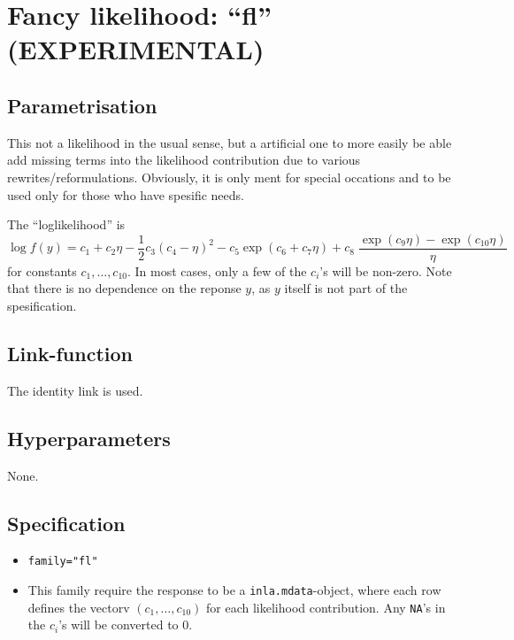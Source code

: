 \documentclass[a4paper,11pt]{article}
\begin{document}
\section*{Fancy likelihood: ``fl'' (EXPERIMENTAL)}

\subsection*{Parametrisation}

This not a likelihood in the usual sense, but a artificial one to more
easily be able add missing terms into the likelihood contribution due
to various rewrites/reformulations. Obviously, it is only ment for
special occations and to be used only for those who have spesific
needs.

The ``loglikelihood'' is
\begin{displaymath}
    \log f(y) = c_1 + c_2 \eta -\frac{1}{2} c_3 (c_4 - \eta)^{2} -
    c_5 \exp(c_6 + c_7 \eta) + c_8\;\frac{\exp(c_9 \eta)-\exp(c_{10}\eta)}{\eta}
\end{displaymath}
for constants $c_1, \ldots, c_{10}$. In most cases, only a few of the
$c_i$'s will be non-zero. Note that there is no dependence on the
reponse $y$, as $y$ itself is not part of the spesification.

\subsection*{Link-function}

The identity link is used.

\subsection*{Hyperparameters}

None.

\subsection*{Specification}

\begin{itemize}
\item \texttt{family="fl"}
\item This family require the response to be a
    \texttt{inla.mdata}-object, where each row defines the vectorv
    $(c_1, \ldots, c_{10})$ for each likelihood contribution. Any
    \texttt{NA}'s in the $c_i$'s will be converted to 0.
\end{itemize}
\end{document}

